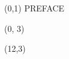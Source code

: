 \documentclass[10pt]{article}
\begin{document}
\begin{textblock}{23}(0,1)
\center\huge PREFACE
\end{textblock}

\begin{textblock}{11}(0, 3)
    
    
\end{textblock}

\begin{textblock}{11}(12,3)
    
    
\end{textblock}
\end{document}
